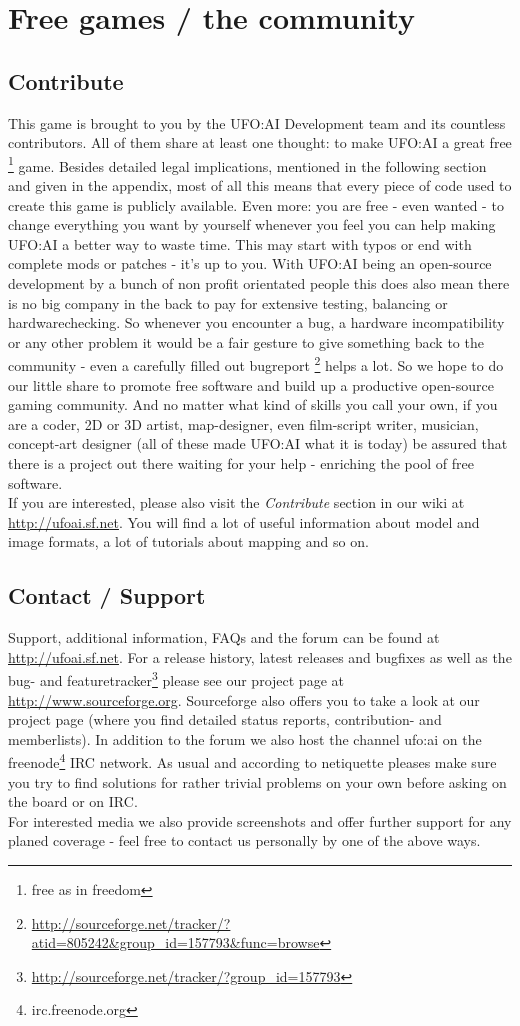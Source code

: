 \section{Free games / the community}
\subsection{Contribute}
This game is brought to you by the UFO:AI Development team and its countless contributors. All of them share at least one thought: to make UFO:AI a great free \footnote{free as in freedom} game. Besides detailed legal implications, mentioned in the following section and given in the appendix, most of all this means that every piece of code used to create this game is publicly available. Even more: you are free - even wanted - to change everything you want by yourself whenever you feel you can help making UFO:AI a better way to waste time. This may start with typos or end with complete mods or patches - it's up to you. With UFO:AI being an open-source development by a bunch of non profit orientated people this does also mean there is no big company in the back to pay for extensive testing, balancing or hardwarechecking. So whenever you encounter a bug, a hardware incompatibility or any other problem it would be a fair gesture to give something back to the community - even a carefully filled out bugreport \footnote{\url{http://sourceforge.net/tracker/?atid=805242&group_id=157793&func=browse}} helps a lot. So we hope to do our little share to promote free software and build up a productive open-source gaming community. And no matter what kind of skills you call your own, if you are a coder, 2D or 3D artist, map-designer, even film-script writer, musician, concept-art designer (all of these made UFO:AI what it is today) be assured that there is a project out there waiting for your help - enriching the pool of free software.\\
If you are interested, please also visit the \textit{Contribute} section in our wiki at \url{http://ufoai.sf.net}. You will find a lot of useful information about model and image formats, a lot of tutorials about mapping and so on.

\subsection{Contact / Support}
Support, additional information, FAQs and the forum can be found at \url{http://ufoai.sf.net}.
For a release history, latest releases and bugfixes as well as the bug- and featuretracker\footnote{\url{http://sourceforge.net/tracker/?group_id=157793}} please see our project page at \url{http://www.sourceforge.org}.
Sourceforge also offers you to take a look at our project page (where you find detailed status reports, contribution- and memberlists). In addition to the forum we also host the channel ufo:ai on the freenode\footnote{irc.freenode.org} IRC network. As usual and according to netiquette pleases make sure you try to find solutions for rather trivial problems on your own before asking on the board or on IRC.\\
For interested media we also provide screenshots and offer further support for any planed coverage - feel free to contact us personally by one of the above ways.
